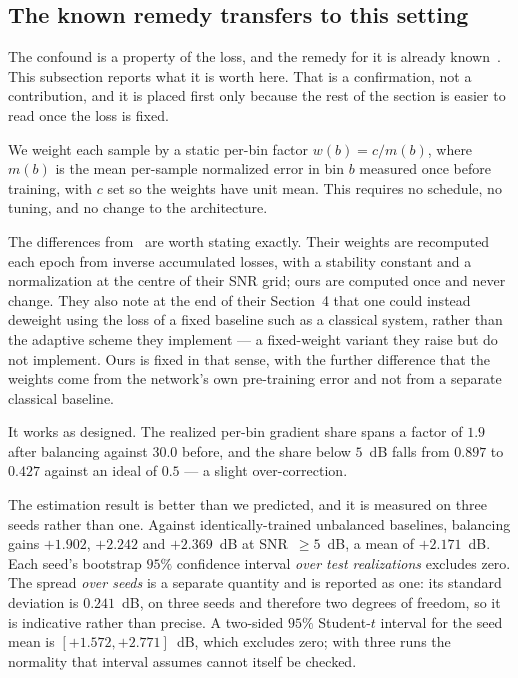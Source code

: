 \documentclass[journal]{IEEEtran}
\begin{document}
\subsection{The known remedy transfers to this setting}
\label{sec:balanced}

The confound is a property of the loss, and the remedy for it is already
known~\cite{wiesmayr2023bler}. This subsection reports what it is worth here.
That is a confirmation, not a contribution, and it is placed first only because
the rest of the section is easier to read once the loss is fixed.

We weight each
sample by a static per-bin factor $w(b)=c/m(b)$, where $m(b)$ is the mean
per-sample normalized error in bin $b$ measured once before training, with $c$
set so the weights have unit mean. This requires no schedule, no tuning, and
no change to the architecture.

The differences from~\cite{wiesmayr2023bler} are worth stating exactly. Their
weights are recomputed each epoch from inverse accumulated losses, with a
stability constant and a normalization at the centre of their SNR grid; ours
are computed once and never change. They also note at the end of their
Section~4 that one could instead deweight using the loss of a fixed baseline
such as a classical system, rather than the adaptive scheme they implement ---
a fixed-weight variant they raise but do not implement. Ours is fixed in that
sense, with the further difference that the weights come from the network's own
pre-training error and not from a separate classical baseline.

It works as designed. The realized per-bin gradient share spans a factor of
$1.9$ after balancing against $30.0$ before, and the share below $5$~dB falls
from $0.897$ to $0.427$ against an ideal of $0.5$ --- a slight
over-correction.

The estimation result is better than we predicted, and it is measured on three
seeds rather than one. Against identically-trained unbalanced baselines,
balancing gains $+1.902$, $+2.242$ and $+2.369$~dB at SNR~$\ge5$~dB, a mean of
$\mathbf{+2.171}$~dB. Each seed's bootstrap $95\%$ confidence interval
\emph{over test realizations} excludes zero. The spread \emph{over seeds} is a
separate quantity and is reported as one: its standard deviation is
$0.241$~dB, on three seeds and therefore two degrees of freedom, so it is
indicative rather than precise. A two-sided $95\%$ Student-$t$ interval for the
seed mean is $[+1.572,+2.771]$~dB, which excludes zero; with three runs the
normality that interval assumes cannot itself be checked.
\end{document}
